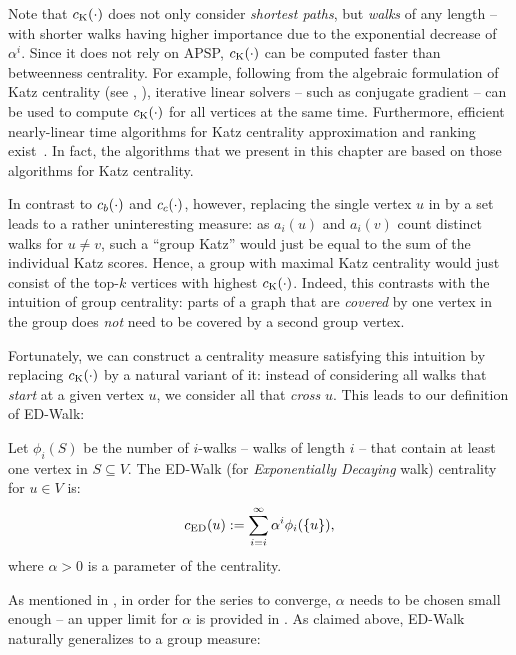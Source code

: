 Note that $c_{\text{K}}(\cdot)$ does not
only consider \emph{shortest paths}, but \emph{walks} of any length -- with
shorter walks having higher importance due to the exponential decrease of
$\alpha^i$. Since it does not rely on APSP, $c_{\text{K}}(\cdot)$ can be computed faster
than betweenness centrality. For example, following from the algebraic formulation
of Katz centrality (see , ),
iterative linear solvers -- such as conjugate gradient -- can be used to
compute $c_{\text{K}}(\cdot)$ for all vertices at the same time.
Furthermore, efficient nearly-linear time algorithms for Katz centrality
approximation and ranking exist~\cite{DBLP:conf/esa/GrintenBGBM18}.
In fact, the algorithms that we present in this chapter are based on
those algorithms for Katz centrality.

In contrast to $c_b(\cdot)$ and $c_c(\cdot)$, however, replacing the single vertex
$u$ in  by a set leads to a rather uninteresting
measure: as $a_i(u)$ and $a_i(v)$ count distinct walks for $u \neq v$,
such a \enquote{group Katz} would just be equal to the sum of the individual
Katz scores. Hence, a group with maximal Katz centrality would just
consist of the top-$k$ vertices with highest $c_{\text{K}}(\cdot)$.
Indeed, this contrasts with the intuition of group centrality:
parts of a graph that are \emph{covered} by one vertex in the group
does \emph{not} need to be covered by a second group vertex.

Fortunately, we can construct a centrality measure satisfying this
intuition by replacing $c_{\text{K}}(\cdot)$ by a natural variant of it: instead of
considering all walks that \emph{start} at a given vertex $u$, we consider
all that \emph{cross} $u$. This leads to our definition
of ED-Walk:
%
\begin{definition}[ED-Walk]
Let $\phi_i(S)$ be the number of $i$-walks -- \ie walks of length $i$ -- that
contain at least one vertex in $S \subseteq V$. The ED-Walk (for \emph{Exponentially
Decaying} walk) centrality for $u \in V$ is:
%
\[
    \ed(u) := \sum_{i = i}^{\infty}\alpha^i \phi_i(\set{u}),
\]
%
where $\alpha > 0$ is a parameter of the centrality.
\end{definition}

As mentioned in , in order for the series to
converge, $\alpha$ needs to be chosen small enough -- an upper limit for
$\alpha$ is provided in .
As claimed above, ED-Walk naturally generalizes to a group measure:

